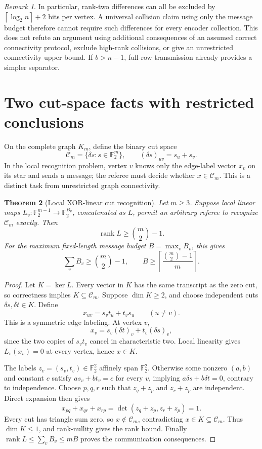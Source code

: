 \documentclass[11pt]{article}
\newtheorem{theorem}{Theorem}[section]
\theoremstyle{remark}
\newtheorem{remark}[theorem]{Remark}
\newcommand{\F}{\mathbb F_2}
\newcommand{\rank}{\operatorname{rank}}
\newcommand{\Cut}{\mathcal C}
\newcommand{\ceil}[1]{\left\lceil #1\right\rceil}
\begin{document}
\begin{remark}
In particular, rank-two differences can all be excluded by
$\ceil{\log_2 n}+2$ bits per vertex. A universal collision claim using
only the message budget therefore cannot require such differences for
every encoder collection. This does not refute an argument using
additional consequences of an assumed correct connectivity protocol,
exclude high-rank collisions, or give an unrestricted connectivity
upper bound. If $b>n-1$, full-row transmission already provides a simpler
separator.
\end{remark}

\section{Two cut-space facts with restricted conclusions}

On the complete graph $K_m$, define the binary cut space
\[
 \Cut_m=\{\delta s:s\in\F^m\},\qquad
 (\delta s)_{uv}=s_u+s_v.
\]
In the local recognition problem, vertex $v$ knows only the edge-label
vector $x_v$ on its star and sends a message; the referee must decide
whether $x\in\Cut_m$. This is a distinct task from unrestricted graph
connectivity.

\begin{theorem}[Local XOR-linear cut recognition]\label{thm:cutrank}
Let $m\ge3$. Suppose local linear maps
$L_v:\F^{m-1}\to\F^{B_v}$, concatenated as $L$, permit an arbitrary
referee to recognize $\Cut_m$ exactly. Then
\[
 \rank L\ge\binom m2-1.
\]
For the maximum fixed-length message budget $B=\max_v B_v$, this gives
\[
 \sum_v B_v\ge\binom m2-1,
 \qquad B\ge\ceil{\frac{\binom m2-1}{m}}.
\]
\end{theorem}

\begin{proof}
Let $K=\ker L$. Every vector in $K$ has the same transcript as the zero
cut, so correctness implies $K\subseteq\Cut_m$. Suppose $\dim K\ge2$,
and choose independent cuts $\delta s,\delta t\in K$. Define
\[
 x_{uv}=s_vt_u+t_vs_u\qquad(u\ne v).
\]
This is a symmetric edge labeling. At vertex $v$,
\[
 x_v=s_v(\delta t)_v+t_v(\delta s)_v,
\]
since the two copies of $s_vt_v$ cancel in characteristic two.
Local linearity gives $L_v(x_v)=0$ at every vertex, hence $x\in K$.

The labels $z_v=(s_v,t_v)\in\F^2$ affinely span $\F^2$. Otherwise
some nonzero $(a,b)$ and constant $c$ satisfy $as_v+bt_v=c$ for every
$v$, implying $a\delta s+b\delta t=0$, contrary to independence.
Choose $p,q,r$ such that $z_q+z_p$ and $z_r+z_p$ are independent.
Direct expansion then gives
\[
 x_{pq}+x_{qr}+x_{rp}
 =\det(z_q+z_p,z_r+z_p)=1.
\]
Every cut has triangle sum zero, so $x\notin\Cut_m$, contradicting
$x\in K\subseteq\Cut_m$. Thus $\dim K\le1$, and rank-nullity gives
the rank bound. Finally $\rank L\le\sum_v B_v\le mB$ proves the
communication consequences.
\end{proof}
\end{document}
